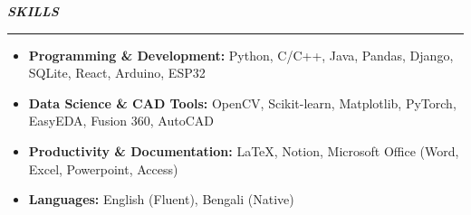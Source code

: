 {\noindent\fontsize{13pt}{16pt}\bfseries\itshape SKILLS\par}
\vspace{0.5em}
\hrule
\vspace{0.7em}

\noindent
\begin{itemize}[leftmargin=1em, itemsep=0em, labelsep=0.5em]
    \item \textbf{Programming \& Development:} Python, C/C++, Java, Pandas, Django, SQLite, React, Arduino, ESP32
    \item \textbf{Data Science \& CAD Tools:} OpenCV, Scikit-learn, Matplotlib, PyTorch, EasyEDA, Fusion 360, AutoCAD
    \item \textbf{Productivity \& Documentation:} LaTeX, Notion, Microsoft Office (Word, Excel, Powerpoint, Access)
    \item \textbf{Languages:} English (Fluent), Bengali (Native)
\end{itemize}
